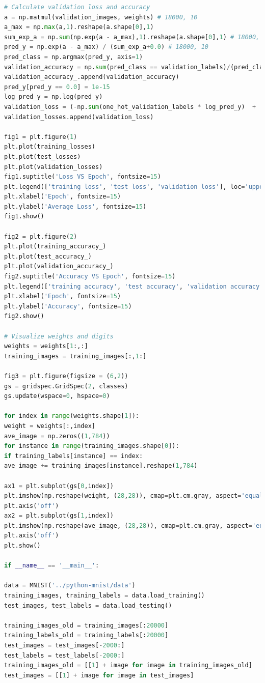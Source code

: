 \documentclass{article} %
\begin{document}
{\begin{lstlisting}[language=Python]
# Calculate validation loss and accuracy
a = np.matmul(validation_images, weights) # 18000, 10
a_max = np.max(a,1).reshape(a.shape[0],1)
sum_exp_a = np.sum(np.exp(a - a_max),1).reshape(a.shape[0],1) # 18000, 1
pred_y = np.exp(a - a_max) / (sum_exp_a+0.0) # 18000, 10
pred_class = np.argmax(pred_y, axis=1)
validation_accuracy = np.sum(pred_class == validation_labels)/(pred_class.shape[0]+0.0) 
validation_accuracy_.append(validation_accuracy)
pred_y[pred_y == 0.0] = 1e-15
log_pred_y = np.log(pred_y)
validation_loss = (-np.sum(one_hot_validation_labels * log_pred_y)  +  lambd*LA.norm(weights)**2) / validation_images.shape[0]
validation_losses.append(validation_loss) 

fig1 = plt.figure(1)
plt.plot(training_losses)
plt.plot(test_losses)
plt.plot(validation_losses)
fig1.suptitle('Loss VS Epoch', fontsize=15)
plt.legend(['training loss', 'test loss', 'validation loss'], loc='upper right')
plt.xlabel('Epoch', fontsize=15)
plt.ylabel('Average Loss', fontsize=15)
fig1.show()

fig2 = plt.figure(2)
plt.plot(training_accuracy_)
plt.plot(test_accuracy_)
plt.plot(validation_accuracy_)
fig2.suptitle('Accuracy VS Epoch', fontsize=15)
plt.legend(['training accuracy', 'test accuracy', 'validation accuracy'], loc='lower right')
plt.xlabel('Epoch', fontsize=15)
plt.ylabel('Accuracy', fontsize=15)
fig2.show()

# Visualize weights and digits
weights = weights[1:,:]
training_images = training_images[:,1:]

fig3 = plt.figure(figsize = (6,2))
gs = gridspec.GridSpec(2, classes)
gs.update(wspace=0, hspace=0)

for index in range(weights.shape[1]):
weight = weights[:,index]
ave_image = np.zeros((1,784))
for instance in range(training_images.shape[0]):
if training_labels[instance] == index:
ave_image += training_images[instance].reshape(1,784)

ax1 = plt.subplot(gs[0,index])
plt.imshow(np.reshape(weight, (28,28)), cmap=plt.cm.gray, aspect='equal')
plt.axis('off')
ax2 = plt.subplot(gs[1,index])
plt.imshow(np.reshape(ave_image, (28,28)), cmap=plt.cm.gray, aspect='equal')
plt.axis('off')
plt.show()

if __name__ == '__main__':

data = MNIST('../python-mnist/data')
training_images, training_labels = data.load_training()
test_images, test_labels = data.load_testing()

training_images_old = training_images[:20000]
training_labels_old = training_labels[:20000]
test_images = test_images[-2000:]
test_labels = test_labels[-2000:]
training_images_old = [[1] + image for image in training_images_old]
test_images = [[1] + image for image in test_images]


\end{lstlisting}}
\end{document}
